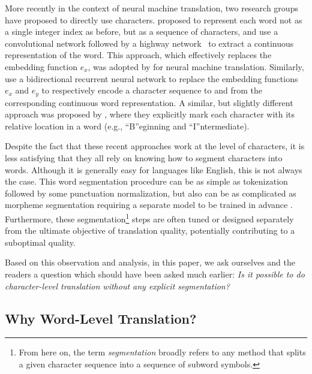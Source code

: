 \documentclass[11pt]{article}
\begin{document}
More recently in the context of neural machine translation, two research groups
have proposed to directly use characters.  proposed to
represent each word not as a single integer index as before, but as a sequence
of characters, and use a convolutional network followed by a highway network~\cite{srivastava2015training} to
extract a continuous representation of the word. This approach, which
effectively replaces the embedding function $e_x$, was adopted by
 for neural machine translation. Similarly,
 use a bidirectional recurrent neural network to
replace the embedding functions $e_x$ and $e_y$ to respectively encode a
character sequence to and from the corresponding continuous word representation.
A similar, but slightly different approach was proposed by 
, where they
explicitly mark each character with its relative location in a word (e.g., ``B''eginning
and ``I''ntermediate). 

Despite the fact that these recent approaches work at the level of
characters, it is less satisfying that they all rely on knowing how to segment
characters into words. Although it is generally easy for languages like English,
this is not always the case. This word segmentation procedure can be as
simple as tokenization followed by some punctuation normalization, but also can
be as complicated as morpheme segmentation requiring a separate model to be
trained in advance \cite{creutz2005unsupervised,huang2007chinese}. Furthermore,
these segmentation\footnote{
    From here on, the term {\em segmentation} broadly refers to any
    method that splits a given character sequence into a sequence of subword
    symbols.
}
steps are often tuned or designed separately from the ultimate objective of
translation quality, potentially contributing to a suboptimal quality.

Based on this observation and analysis, in this paper, we ask ourselves and the
readers a question which should have been asked much earlier: {\em Is it
possible to do character-level translation without any explicit segmentation?}

\subsection{Why Word-Level Translation?}
\end{document}
